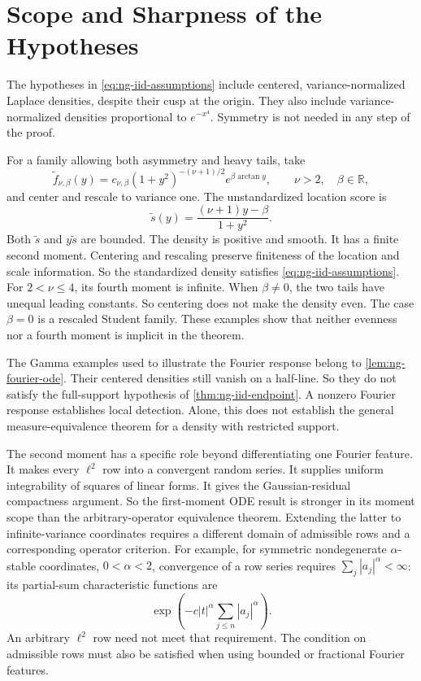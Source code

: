 \section{Scope and Sharpness of the Hypotheses}
\label{sec:scope-and-sharpness}

The hypotheses in \eqref{eq:ng-iid-assumptions} include centered,
variance-normalized Laplace densities, despite their cusp at the origin.
They also include variance-normalized densities proportional to $e^{-x^4}$.
Symmetry is not needed in any step of the proof.

For a family allowing both asymmetry and heavy tails, take
\begin{equation}
 \widetilde f_{\nu,\beta}(y)
   =c_{\nu,\beta}(1+y^2)^{-(\nu+1)/2}
                           e^{\beta\arctan y},
 \qquad \nu>2,\quad \beta\in\mathbb R,
 \label{eq:ng-asymmetric-heavy-tail-example}
\end{equation}
and center and rescale to variance one.
The unstandardized location score is
\[
 \widetilde s(y)=\frac{(\nu+1)y-\beta}{1+y^2}.
\]
Both \(\widetilde s\) and \(y\widetilde s\) are bounded.
The density is positive and smooth.
It has a finite second moment.
Centering and rescaling preserve finiteness of the location and scale
information.
So the standardized density satisfies \eqref{eq:ng-iid-assumptions}.
For \(2<\nu\le4\), its fourth moment is infinite.
When \(\beta\ne0\), the two tails have unequal leading constants.
So centering does not make the density even.
The case \(\beta=0\) is a rescaled Student family.
These examples show that neither evenness nor a fourth moment is implicit in
the theorem.

The Gamma examples used to illustrate the Fourier response belong to
\cref{lem:ng-fourier-ode}.
Their centered densities still vanish on a half-line.
So they do not satisfy the full-support hypothesis of
\cref{thm:ng-iid-endpoint}.
A nonzero Fourier response establishes local detection.
Alone, this does not establish the general measure-equivalence theorem for a
density with restricted support.

The second moment has a specific role beyond differentiating one Fourier
feature.
It makes every \(\ell^2\) row into a convergent random series.
It supplies uniform integrability of squares of linear forms.
It gives the Gaussian-residual compactness argument.
So the first-moment ODE result is stronger in its moment scope than the
arbitrary-operator equivalence theorem.
Extending the latter to infinite-variance coordinates requires a different
domain of admissible rows and a corresponding operator criterion.
For example, for symmetric nondegenerate \(\alpha\)-stable coordinates,
\(0<\alpha<2\), convergence of a row series requires
$\sum_j|a_j|^\alpha<\infty$: its partial-sum characteristic
functions are
\[
 \exp\left(-c|t|^\alpha\sum_{j\le n}|a_j|^\alpha\right).
\]
An arbitrary \(\ell^2\) row need not meet that requirement.
The condition on admissible rows must also be satisfied when using bounded
or fractional Fourier features.

